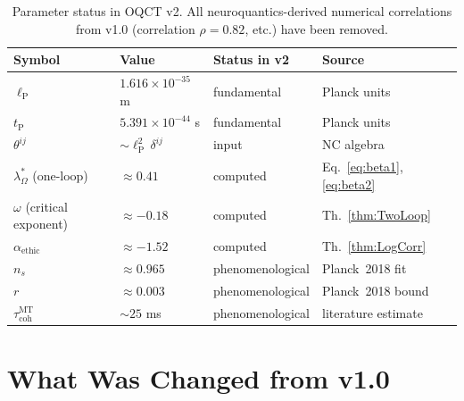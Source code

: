 \documentclass[11pt,a4paper]{article}
\theoremstyle{myrmk}
\newcommand{\lP}{\ell_{\mathrm{P}}}
\newcommand{\tP}{t_{\mathrm{P}}}
\begin{document}
\begin{table}[H]
\centering\small
\renewcommand{\arraystretch}{1.22}
\begin{tabular}{llll}
\toprule
\textbf{Symbol} & \textbf{Value} & \textbf{Status in v2} & \textbf{Source} \\ \midrule
$\lP$                            & $1.616\times 10^{-35}$ m & fundamental & Planck units \\
$\tP$                            & $5.391\times 10^{-44}$ s & fundamental & Planck units \\
$\theta^{ij}$                    & $\sim\lP^{2}\,\delta^{ij}$ & input        & NC algebra \\
$\lambda_\Omega^{*}$ (one-loop)  & $\approx 0.41$         & computed     & Eq.~\eqref{eq:beta1}, \eqref{eq:beta2} \\
$\omega$ (critical exponent)     & $\approx -0.18$        & computed     & Th.~\ref{thm:TwoLoop} \\
$\alpha_{\mathrm{ethic}}$        & $\approx -1.52$        & computed     & Th.~\ref{thm:LogCorr} \\
$n_s$                            & $\approx 0.965$        & phenomenological & Planck~2018 fit \\
$r$                              & $\approx 0.003$        & phenomenological & Planck~2018 bound \\
$\tau_{\mathrm{coh}}^{\mathrm{MT}}$ & $\sim 25$ ms        & phenomenological & literature estimate \\
\bottomrule
\end{tabular}
\caption{Parameter status in OQCT v2. All neuroquantics-derived numerical correlations
from v1.0 (correlation $\rho=0.82$, etc.) have been removed.}
\end{table}

\section{What Was Changed from v1.0}
\label{sec:appendix-changes}
\end{document}
